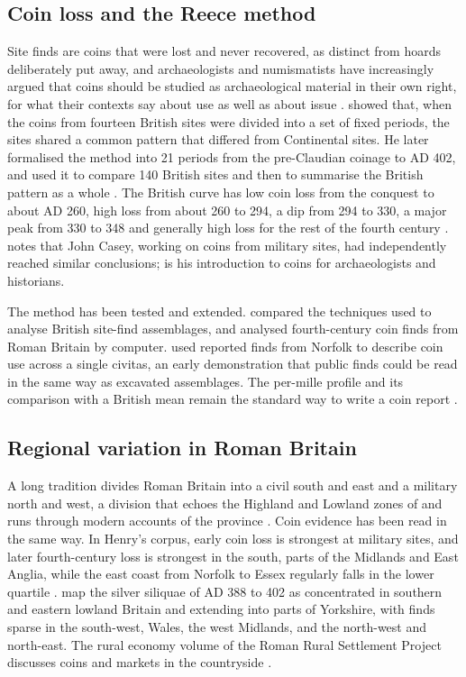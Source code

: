 \documentclass[11pt,a4paper]{article}
\begin{document}
\subsection{Coin loss and the Reece method}
Site finds are coins that were lost and never recovered, as distinct from hoards deliberately put away, and archaeologists and numismatists have increasingly argued that coins should be studied as archaeological material in their own right, for what their contexts say about use as well as about issue \citep{casey1986,kemmers2011}. \citet{reece1972} showed that, when the coins from fourteen British sites were divided into a set of fixed periods, the sites shared a common pattern that differed from Continental sites. He later formalised the method into 21 periods from the pre-Claudian coinage to AD 402, and used it to compare 140 British sites \citep{reece1991} and then to summarise the British pattern as a whole \citep{reece1995}. The British curve has low coin loss from the conquest to about AD 260, high loss from about 260 to 294, a dip from 294 to 330, a major peak from 330 to 348 and generally high loss for the rest of the fourth century \citep{reece1995}. \citet{reece1995} notes that John Casey, working on coins from military sites, had independently reached similar conclusions; \citet{casey1986} is his introduction to coins for archaeologists and historians.

The method has been tested and extended. \citet{lockyear2000} compared the techniques used to analyse British site-find assemblages, and \citet{ryan1988} analysed fourth-century coin finds from Roman Britain by computer. \citet{davies1991} used reported finds from Norfolk to describe coin use across a single civitas, an early demonstration that public finds could be read in the same way as excavated assemblages. The per-mille profile and its comparison with a British mean remain the standard way to write a coin report \citep{henry2024}.

\subsection{Regional variation in Roman Britain}
A long tradition divides Roman Britain into a civil south and east and a military north and west, a division that echoes the Highland and Lowland zones of \citet{fox1932} and runs through modern accounts of the province \citep{millett1990,mattingly2006}. Coin evidence has been read in the same way. In Henry's corpus, early coin loss is strongest at military sites, and later fourth-century loss is strongest in the south, parts of the Midlands and East Anglia, while the east coast from Norfolk to Essex regularly falls in the lower quartile \citep{henry2024}. \citet{walton2016} map the silver siliquae of AD 388 to 402 as concentrated in southern and eastern lowland Britain and extending into parts of Yorkshire, with finds sparse in the south-west, Wales, the west Midlands, and the north-west and north-east. The rural economy volume of the Roman Rural Settlement Project discusses coins and markets in the countryside \citep{brindle2017}.
\end{document}
